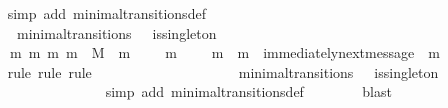 \begin{isabellebody}
\ \ \ \ \isamarkupfalse%
\ {\isacharparenleft}simp\ add{\isacharcolon}\ minimal{\isacharunderscore}transitions{\isacharunderscore}def{\isacharparenright}\isanewline
\ \ \isamarkupfalse%
\ {\isachardoublequoteopen}{\isasymforall}\ {\isasymsigma}\ {\isasymsigma}{\isacharprime}{\isachardot}\ {\isacharparenleft}{\isasymsigma}{\isacharcomma}\ {\isasymsigma}{\isacharprime}{\isacharparenright}\ {\isasymin}\ minimal{\isacharunderscore}transitions\ {\isasymand}\ {\isasymnot}\ is{\isacharunderscore}singleton\ {\isacharparenleft}{\isasymsigma}{\isacharprime}{\isacharminus}\ {\isasymsigma}{\isacharparenright}\isanewline
\ \ \ \ {\isasymlongrightarrow}\ {\isacharparenleft}{\isasymexists}\ m{}\ m{}{\isachardot}\ {\isacharbraceleft}m{}{\isacharcomma}\ m{}{\isacharbraceright}\ {\isasymsubseteq}\ M\ {\isasymand}\ m{}\ {\isasymin}\ {\isasymsigma}{\isacharprime}{\isacharminus}\ {\isasymsigma}\ {\isasymand}\ m{}\ {\isasymin}\ {\isasymsigma}{\isacharprime}{\isacharminus}\ {\isasymsigma}\ {\isasymand}\ m{}\ {\isasymnoteq}\ m{}\ {\isasymand}\ immediately{\isacharunderscore}next{\isacharunderscore}message\ {\isacharparenleft}{\isasymsigma}{\isacharcomma}\ m{}{\isacharparenright}{\isacharparenright}{\isachardoublequoteclose}\isanewline
\ \ \ \ \isamarkupfalse%
\ {\isacharparenleft}rule{\isacharcomma}\ rule{\isacharcomma}\ rule{\isacharparenright}\isanewline
\ \ \isamarkupfalse%
\ {\isacharminus}\isanewline
\ \ \ \ \isamarkupfalse%
\ {\isasymsigma}\ {\isasymsigma}{\isacharprime}\isanewline
\ \ \ \ \isamarkupfalse%
\ {\isachardoublequoteopen}{\isacharparenleft}{\isasymsigma}{\isacharcomma}\ {\isasymsigma}{\isacharprime}{\isacharparenright}\ {\isasymin}\ minimal{\isacharunderscore}transitions\ {\isasymand}\ {\isasymnot}\ is{\isacharunderscore}singleton\ {\isacharparenleft}{\isasymsigma}{\isacharprime}\ {\isacharminus}\ {\isasymsigma}{\isacharparenright}{\isachardoublequoteclose}\isanewline
\ \ \ \ \isamarkupfalse%
\ \isamarkupfalse%
\ {\isachardoublequoteopen}{\isasymsigma}{\isacharprime}\ {\isacharminus}\ {\isasymsigma}\ {\isasymnoteq}\ {\isasymemptyset}{\isachardoublequoteclose}\isanewline
\ \ \ \ \ \ \isamarkupfalse%
\ {\isacharparenleft}simp\ add{\isacharcolon}\ minimal{\isacharunderscore}transitions{\isacharunderscore}def{\isacharparenright}\isanewline
\ \ \ \ \ \ \isamarkupfalse%
\ blast\isanewline
\ \ \ \ \isamarkupfalse%

\end{isabellebody}
